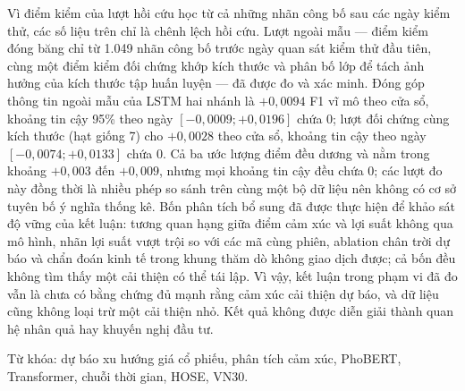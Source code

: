 Vì điểm kiểm của lượt hồi cứu học từ cả những nhãn công bố sau các ngày kiểm
thử, các số liệu trên chỉ là chênh lệch hồi cứu. Lượt ngoài mẫu --- điểm kiểm
đóng băng chỉ từ 1.049 nhãn công bố trước ngày quan sát kiểm thử đầu tiên, cùng
một điểm kiểm đối chứng khớp kích thước và phân bố lớp để tách ảnh hưởng của
kích thước tập huấn luyện --- đã được đo và xác minh. Đóng góp thông tin ngoài
mẫu của LSTM hai nhánh là $+0{,}0094$ F1 vĩ mô theo cửa sổ, khoảng tin cậy 95\%
theo ngày $[-0{,}0009; +0{,}0196]$ chứa 0; lượt đối chứng cùng kích thước (hạt
giống 7) cho $+0{,}0028$ theo cửa sổ, khoảng tin cậy theo ngày $[-0{,}0074;
+0{,}0133]$ chứa 0. Cả ba ước lượng điểm đều dương và nằm trong khoảng
$+0{,}003$ đến $+0{,}009$, nhưng mọi khoảng tin cậy đều chứa 0; các lượt đo này
đồng thời là nhiều phép so sánh trên cùng một bộ dữ liệu nên không có cơ sở
tuyên bố ý nghĩa thống kê. Bốn phân tích bổ sung đã được thực hiện để khảo sát
độ vững của kết luận: tương quan hạng giữa điểm cảm xúc và lợi suất không qua
mô hình, nhãn lợi suất vượt trội so với các mã cùng phiên, ablation chân trời
dự báo và chẩn đoán kinh tế trong khung thăm dò không giao dịch được; cả bốn
đều không tìm thấy một cải thiện có thể tái lập. Vì vậy, kết luận trong phạm
vi đã đo vẫn là chưa có bằng chứng đủ mạnh rằng cảm xúc cải thiện dự báo, và
dữ liệu cũng không loại trừ một cải thiện nhỏ. Kết quả không được diễn giải
thành quan hệ nhân quả hay khuyến nghị đầu tư.

\vspace{0.5cm}
\noindent Từ khóa: dự báo xu hướng giá cổ phiếu, phân tích cảm xúc, PhoBERT,
Transformer, chuỗi thời gian, HOSE, VN30.
